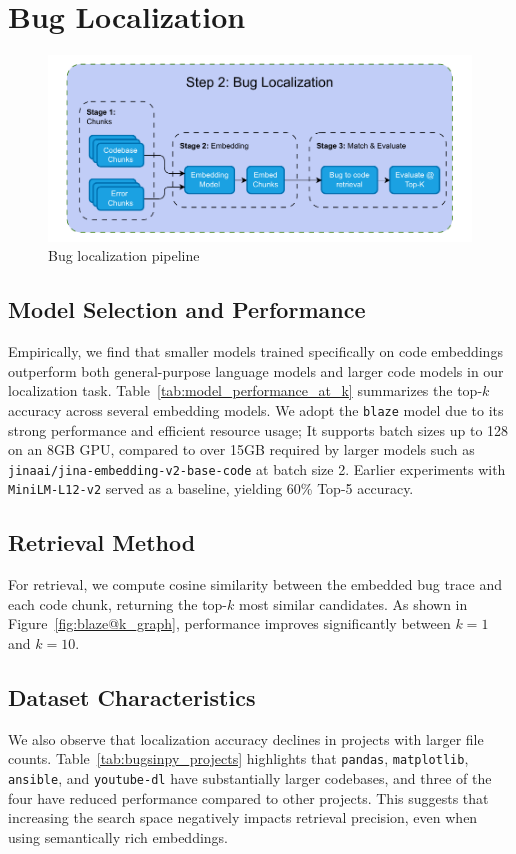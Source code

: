 
\section{Bug Localization}
\begin{figure}[H]
\centering
\includegraphics[width=1\columnwidth]{Figures/Step2_bug_localization.drawio.pdf}
\caption{Bug localization pipeline}
\label{fig:step2_bug_localization}
\end{figure}

\subsection{Model Selection and Performance}
Empirically, we find that smaller models trained specifically on code embeddings outperform both general-purpose language models and larger code models in our localization task. Table~\ref{tab:model_performance_at_k} summarizes the top-$k$ accuracy across several embedding models. We adopt the \texttt{blaze} model due to its strong performance and efficient resource usage; It supports batch sizes up to 128 on an 8GB GPU, compared to over 15GB required by larger models such as \texttt{jinaai/jina-embedding-v2-base-code} at batch size 2. Earlier experiments with \texttt{MiniLM-L12-v2} served as a baseline, yielding 60\% Top-5 accuracy.

\subsection{Retrieval Method}
For retrieval, we compute cosine similarity between the embedded bug trace and each code chunk, returning the top-$k$ most similar candidates. As shown in Figure~\ref{fig:blaze@k_graph}, performance improves significantly between $k=1$ and $k=10$.

\subsection{Dataset Characteristics}
We also observe that localization accuracy declines in projects with larger file counts. Table~\ref{tab:bugsinpy_projects} highlights that \texttt{pandas}, \texttt{matplotlib}, \texttt{ansible}, and \texttt{youtube-dl} have substantially larger codebases, and three of the four have reduced performance compared to other projects. This suggests that increasing the search space negatively impacts retrieval precision, even when using semantically rich embeddings.
